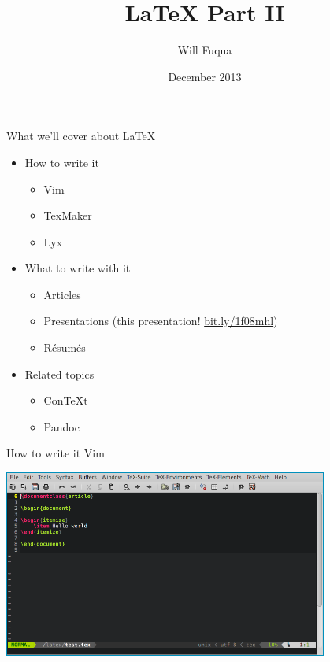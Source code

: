 \documentclass{beamer}
\author{Will Fuqua}
\title{\LaTeX{} Part II}
\institute{Michigan!/usr/group}
\date{December 2013}
\begin{document}
\begin{frame}[t,plain]
    \titlepage
\end{frame}

\begin{frame}[t]{What we'll cover about \LaTeX}
    \begin{itemize}
        \item How to write it
            \begin{itemize}
                \item Vim
                \item TexMaker
                \item Lyx
            \end{itemize}
            \pause
        \item What to write with it
            \begin{itemize}
                \item Articles
                \item Presentations 
                    (this presentation! \href{http://bit.ly/1f08mhl}{bit.ly/1f08mhl})
                \item R\'{e}sum\'{e}s
            \end{itemize}
            \pause
        \item Related topics
            \begin{itemize}
                \item ConTeXt
                \item Pandoc
            \end{itemize}
    \end{itemize}
\end{frame}

\begin{frame}{How to write it \textendash{} Vim}
    \begin{center}
        \includegraphics[width=0.8\textwidth]{img/vim}
    \end{center}
\end{frame}
\end{document}
